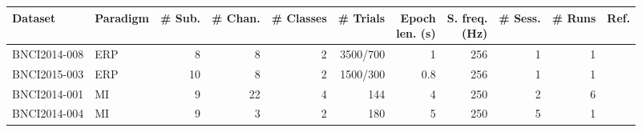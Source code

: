 \begin{tabularx}{\linewidth}{@{}Xlrrrrrrrrr@{}}
  \toprule
  Dataset    &   Paradigm & \# Sub. & \# Chan. &\# Classes & \# Trials & \makecell{Epoch \\ len. (s)}  & \makecell{S. freq.\\(Hz)} & \# Sess.  & \# Runs & Ref. \\
  \midrule
  BNCI2014-008  & ERP & 8       & 8         & 2 & 3500/700 & 1                              & 256                         & 1             & 1      & \cite{Riccio2013}  \\
  BNCI2015-003  & ERP & 10      & 8         & 2 & 1500/300 & 0.8                           & 256                         & 1             & 1       & \cite{Guger2009} \\
  \midrule
  BNCI2014-001  & MI  & 9       & 22        & 4 & 144         & 4                             & 250                         & 2             & 6       & \cite{Tangermann2012} \\
  BNCI2014-004  & MI  & 9       & 3         & 2 & 180             & 5                             & 250                         & 5             & 1       & \cite{Leeb2007}\\
  \bottomrule
\end{tabularx}
